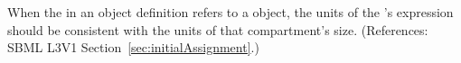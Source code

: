 When the  in an \InitialAssignment object definition refers
to a \Compartment object, the units of the \InitialAssignment's
 expression should be consistent with the units of that
compartment's size.  (References: SBML L3V1
Section~\ref{sec:initialAssignment}.)
